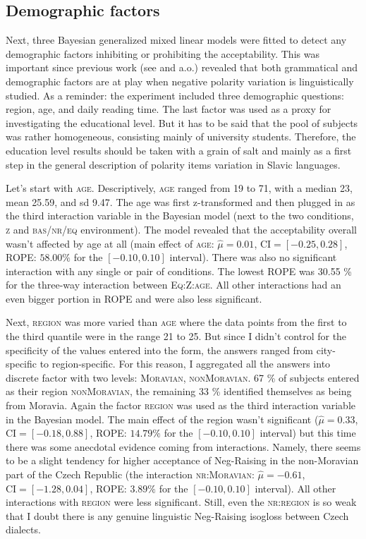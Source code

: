 \subsection{Demographic factors}

Next, three Bayesian generalized mixed linear models were fitted to detect any demographic factors inhibiting or prohibiting the acceptability. This was important since previous work (see \citealt{burnett2015variable} and \citealt{burnett2018structural} a.o.) revealed that both grammatical and demographic factors are at play when negative polarity variation is linguistically studied. As a reminder: the experiment included three demographic questions: region, age, and daily reading time. The last factor was used as a proxy for investigating the educational level. But it has to be said that the pool of subjects was rather homogeneous, consisting mainly of university students. Therefore, the education level results should be taken with a grain of salt and mainly as a first step in the general description of polarity items variation in Slavic languages.

Let's start with \textsc{age}. Descriptively, \textsc{age} ranged from 19 to 71, with a median 23, mean 25.59, and sd 9.47. The age was first z-transformed and then plugged in as the third interaction variable in the Bayesian model (next to the two conditions, \textsc{z} and \textsc{bas/nr/eq} environment). The model revealed that the acceptability overall wasn't affected by age at all (main effect of \textsc{age}: $\hat{\mu}=0.01$, $\mathrm{CI}=[-0.25,  0.28]$, ROPE: $58.00\%$ for the $[-0.10, 0.10]$ interval). There was also no significant interaction with any single or pair of conditions. The lowest ROPE was 30.55 \% for the three-way interaction between \textsc{Eq:Z:age}. All other interactions had an even bigger portion in ROPE and were also less significant.

Next, \textsc{region} was more varied than \textsc{age} where the data points from the first to the third quantile were in the range 21 to 25. But since I didn't control for the specificity of the values entered into the form, the answers ranged from city-specific to region-specific. For this reason, I aggregated all the answers into discrete factor with two levels: \textsc{Moravian, nonMoravian}. 67 \% of subjects entered as their region \textsc{nonMoravian}, the remaining 33 \% identified themselves as being from Moravia. Again the factor \textsc{region} was used as the third interaction variable in the Bayesian model. The main effect of the region wasn't significant ($\hat{\mu}=0.33$, $\mathrm{CI}=[-0.18,  0.88]$, ROPE: $14.79\%$ for the $[-0.10, 0.10]$ interval) but this time there was some anecdotal evidence coming from interactions. Namely, there seems to be a slight tendency for higher acceptance of Neg-Raising in the non-Moravian part of the Czech Republic (the interaction \textsc{nr:Moravian}: $\hat{\mu}=-0.61$, $\mathrm{CI}=[-1.28,  0.04]$, ROPE: $3.89\%$ for the $[-0.10, 0.10]$ interval). All other interactions with \textsc{region} were less significant. Still, even the \textsc{nr:region} is so weak that I doubt there is any genuine linguistic Neg-Raising isogloss between Czech dialects.

